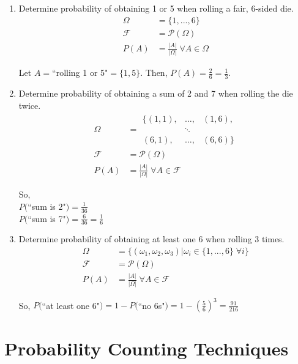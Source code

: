 \documentclass{article}
\begin{document}
	\begin{myex}{}{}
		\begin{enumerate}
			\item Determine probability of obtaining 1 or 5 when rolling a fair, 6-sided die.
			\begin{align*}
				\Omega&=\{1, ..., 6\}\\
				\mathcal{F}&=\mathcal{P}(\Omega)\\
				P(A)&=\frac{|A|}{|\Omega|}\;\forall A\in\Omega
			\end{align*}
			
			Let $A=$``rolling 1 or 5"$=\{1, 5\}$. Then, $P(A)=\frac{2}{6}=\frac{1}{3}$.
			\item Determine probability of obtaining a sum of 2 and 7 when rolling the die twice.
			\begin{align*}
				\Omega&=\begin{matrix}
				\{(1, 1), & \dots, & (1, 6),\\
				& \ddots & \\
				(6, 1), & \dots, & (6, 6)\}
				\end{matrix}\\
				\mathcal{F}&=\mathcal{P}(\Omega)\\
				P(A)&=\frac{|A|}{|\Omega|}\;\forall A\in\mathcal{F}
			\end{align*}
			
			So,\\
			
			$P($``sum is 2"$)=\frac{1}{36}$\\
			
			$P($``sum is 7"$)=\frac{6}{36}=\frac{1}{6}$\\
			\item Determine probability of obtaining at least one 6 when rolling 3 times.
			\begin{align*}
				\Omega&=\{(\omega_1, \omega_2, \omega_3) | \omega_i\in\{1, ..., 6\}\;\forall i\}\\
				\mathcal{F}&=\mathcal{P}(\Omega)\\
				P(A)&=\frac{|A|}{|\Omega|}\;\forall A\in\mathcal{F}
			\end{align*}
			
			So, $P($``at least one 6"$)=1-P($``no 6s"$)=1-(\frac{5}{6})^3=\frac{91}{216}$
		\end{enumerate}
	\end{myex}
	
	\newpage
	\section{Probability Counting Techniques}
\end{document}
